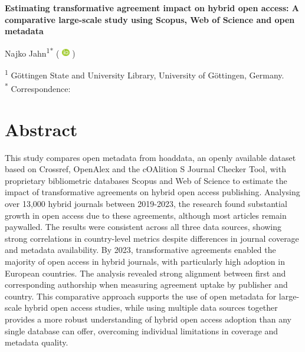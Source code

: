 \documentclass[a4paper,man,floatsintext,longtable,noextraspace,10pt]{apa6}
\begin{document}
\thispagestyle{otherpage}


\begin{large}
\textbf{Estimating transformative agreement impact on hybrid open access: A comparative large-scale study using Scopus, Web of Science and open metadata}
\end{large}

\newcommand{\orcid}{%
  \begingroup\normalfont
  \includegraphics[height=0.9em]{orcid_logo}%
  \endgroup
}

Najko Jahn\textsuperscript{1}\textsuperscript{*} 
(\orcid{} \href{https://orcid.org/0000-0001-5105-1463}{\color{black}{0000-0001-5105-1463}})

\textsuperscript{1} Göttingen State and University Library, University of Göttingen, Germany. \\

\textsuperscript{*} Correspondence: \href{mailto:najko.jahn@sub.uni-goettingen.de}{\color{black}{najko.jahn@sub.uni-goettingen.de}} 

\section*{Abstract}
{This study compares open metadata from hoaddata, an openly available dataset based on Crossref, OpenAlex and the cOAlition S Journal Checker Tool, with proprietary bibliometric databases Scopus and Web of Science to estimate the impact of transformative agreements on hybrid open access publishing. Analysing over 13,000 hybrid journals between 2019-2023, the research found substantial growth in open access due to these agreements, although most articles remain paywalled. The results were consistent across all three data sources, showing strong correlations in country-level metrics despite differences in journal coverage and metadata availability. By 2023, transformative agreements enabled the majority of open access in hybrid journals, with particularly high adoption in European countries. The analysis revealed strong alignment between first and corresponding authorship when measuring agreement uptake by publisher and country. This comparative approach supports the use of open metadata for large-scale hybrid open access studies, while using multiple data sources together provides a more robust understanding of hybrid open access adoption than any single database can offer, overcoming individual limitations in coverage and metadata quality.}
\end{document}
